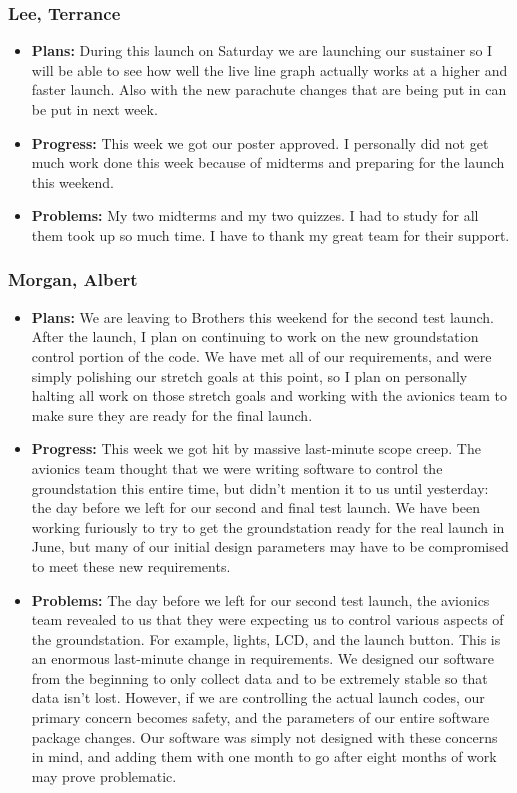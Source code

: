 \documentclass[10pt,draftclsnofoot,onecolumn]{IEEEtran}
\begin{document}
\subsubsection{Lee, Terrance}
\begin{itemize}
	\item \textbf{Plans: }
	During this launch on Saturday we are launching our sustainer so I will be able to see how well the live line graph actually works at a higher and faster launch. Also with the new parachute changes that are being put in can be put in next week.
	\item \textbf{Progress:  }
	This week we got our poster approved. I personally did not get much work done this week because of midterms and preparing for the launch this weekend.
	\item \textbf{Problems: }
	My two midterms and my two quizzes. I had to study for all them took up so much time. I have to thank my great team for their support.
\end{itemize}

\subsubsection{Morgan, Albert}
\begin{itemize}
	\item \textbf{Plans: }
	We are leaving to Brothers this weekend for the second test launch. After the launch, I plan on continuing to work on the new groundstation control portion of the code. We have met all of our requirements, and were simply polishing our stretch goals at this point, so I plan on personally halting all work on those stretch goals and working with the avionics team to make sure they are ready for the final launch.
	\item \textbf{Progress: }
	This week we got hit by massive last-minute scope creep. The avionics team thought that we were writing software to control the groundstation this entire time, but didn't mention it to us until yesterday: the day before we left for our second and final test launch. We have been working furiously to try to get the groundstation ready for the real launch in June, but many of our initial design parameters may have to be compromised to meet these new requirements.
	\item \textbf{Problems: }
	The day before we left for our second test launch, the avionics team revealed to us that they were expecting us to control various aspects of the groundstation. For example, lights, LCD, and the launch button. This is an enormous last-minute change in requirements. We designed our software from the beginning to only collect data and to be extremely stable so that data isn't lost. However, if we are controlling the actual launch codes, our primary concern becomes safety, and the parameters of our entire software package changes. Our software was simply not designed with these concerns in mind, and adding them with one month to go after eight months of work may prove problematic.
\end{itemize}
\end{document}
